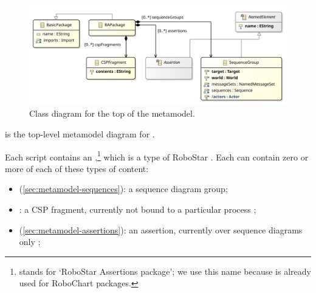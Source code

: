 \begin{figure}[htb]
	\centering
	\includegraphics[width=.85\textwidth]{diagrams/Top}
	\caption{Class diagram for the top of the \langname{} metamodel.}
	\label{fig:metamodel-top}
\end{figure}

 is the top-level metamodel diagram for \langname.

Each \langname{} script contains an \mrapackage,\footnote{\mrapackage{} stands
for `RoboStar Assertions package'; we use this name because \mrcpackage{} is
already used for RoboChart packages.}
which is a type of RoboStar \mbasicpackage.
Each \mrapackage{} can contain zero or more of each of these types of content:

\begin{itemize}
\item
	\msequencegroup{}
	(\cref{sec:metamodel-sequences}):
	a sequence diagram group;
\item
	\mcspfragment:
	a CSP fragment, currently not bound to a particular process
	;
\item
	\massertion{}
	(\cref{sec:metamodel-assertions}):
	an assertion, currently over sequence diagrams only
	;
\end{itemize}

